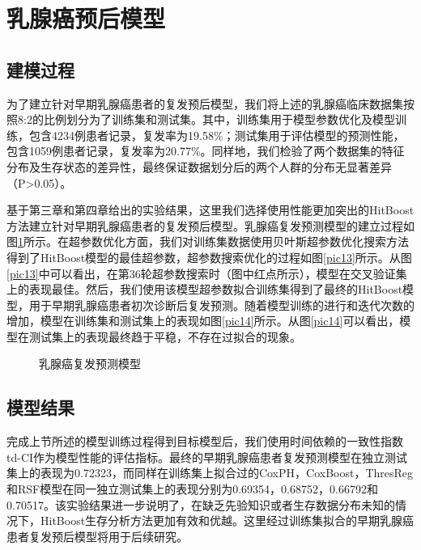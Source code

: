 \section{乳腺癌预后模型}

\subsection{建模过程}
为了建立针对早期乳腺癌患者的复发预后模型，我们将上述的乳腺癌临床数据集按照8:2的比例划分为了训练集和测试集。其中，训练集用于模型参数优化及模型训练，包含4234例患者记录，复发率为19.58\%；测试集用于评估模型的预测性能，包含1059例患者记录，复发率为20.77\%。同样地，我们检验了两个数据集的特征分布及生存状态的差异性，最终保证数据划分后的两个人群的分布无显著差异（P>0.05）。

基于第三章和第四章给出的实验结果，这里我们选择使用性能更加突出的HitBoost方法建立针对早期乳腺癌患者的复发预后模型。乳腺癌复发预测模型的建立过程如图\ref{pic1314}所示。在超参数优化方面，我们对训练集数据使用贝叶斯超参数优化搜索方法得到了HitBoost模型的最佳超参数，超参数搜索优化的过程如图\ref{pic13}所示。从图\ref{pic13}中可以看出，在第36轮超参数搜索时（图中红点所示），模型在交叉验证集上的表现最佳。然后，我们使用该模型超参数拟合训练集得到了最终的HitBoost模型，用于早期乳腺癌患者初次诊断后复发预测。随着模型训练的进行和迭代次数的增加，模型在训练集和测试集上的表现如图\ref{pic14}所示。从图\ref{pic14}可以看出，模型在测试集上的表现最终趋于平稳，不存在过拟合的现象。

\begin{figure}[H]
\centering 
{}
\hspace{0.01\linewidth}
\caption{乳腺癌复发预测模型}
\label{pic1314}
\end{figure}

\subsection{模型结果}

完成上节所述的模型训练过程得到目标模型后，我们使用时间依赖的一致性指数td-CI作为模型性能的评估指标。最终的早期乳腺癌患者复发预测模型在独立测试集上的表现为0.72323，而同样在训练集上拟合过的CoxPH，CoxBoost，ThresReg和RSF模型在同一独立测试集上的表现分别为0.69354，0.68752，0.66792和0.70517。该实验结果进一步说明了，在缺乏先验知识或者生存数据分布未知的情况下，HitBoost生存分析方法更加有效和优越。这里经过训练集拟合的早期乳腺癌患者复发预后模型将用于后续研究。

